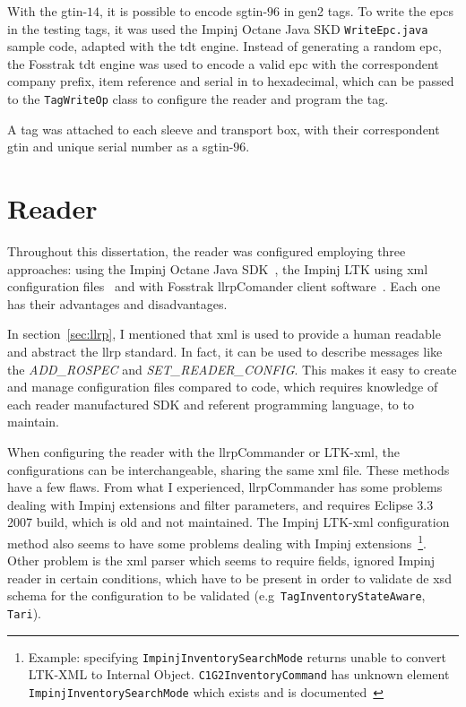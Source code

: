 With the \acs{gtin}-$14$, it is possible to encode \ac{sgtin}-$96$ in \ac{gen2} tags. To write the \acp{epc} in the testing tags, it was used the Impinj Octane Java SKD \texttt{WriteEpc.java} sample code, adapted with the \ac{tdt} engine. Instead of generating a random \ac{epc}, the Fosstrak \ac{tdt} engine was used to encode a valid \ac{epc} with the correspondent company prefix, item reference and serial in to hexadecimal, which can be passed to the \texttt{TagWriteOp} class to configure the reader and program the tag.

A tag was attached to each sleeve and transport box, with their correspondent \ac{gtin} and unique serial number as a \ac{sgtin}-$96$.

\section{Reader} \label{sec:readerconfiguration}

Throughout this dissertation, the reader was configured employing three approaches: using the Impinj Octane Java SDK~\cite{OctaneSDK}, the Impinj LTK using \ac{xml} configuration files~\cite{LTKXMLJava} and with Fosstrak \ac{llrp}Comander client software~\cite{FosstrakLLRPCommander}.
Each one has their advantages and disadvantages.

In section~\ref{sec:llrp}, I mentioned that \ac{xml} is used to provide a human readable and abstract the \ac{llrp} standard.
In fact, it can be used to describe messages like the \textit{ADD\_ROSPEC} and \textit{SET\_READER\_CONFIG}.
This makes it easy to create and manage configuration files compared to code, which requires knowledge of each reader manufactured SDK and referent programming language, to to maintain.

When configuring the reader with the \acs{llrp}Commander or LTK-\ac{xml}, the configurations can be interchangeable, sharing the same \ac{xml} file. These methods have a few flaws. From what I experienced, \ac{llrp}Commander has some problems dealing with Impinj extensions and filter parameters, and requires Eclipse $3.3$ 2007 build, which is old and not maintained.
The Impinj LTK-\ac{xml} configuration method also seems to have some problems dealing with Impinj extensions~\footnote{Example: specifying \texttt{ImpinjInventorySearchMode} returns unable to convert LTK-XML to Internal Object. \texttt{C1G2InventoryCommand} has unknown element \texttt{ImpinjInventorySearchMode} which exists and is documented~\cite{ImpinjLTKProgrammers}}.
Other problem is the \ac{xml} parser which seems to require fields, ignored Impinj reader in certain conditions, which have to be present in order to validate de \ac{xsd} schema for the configuration to be validated (e.g\ \texttt{TagInventoryStateAware}, \texttt{Tari}).

